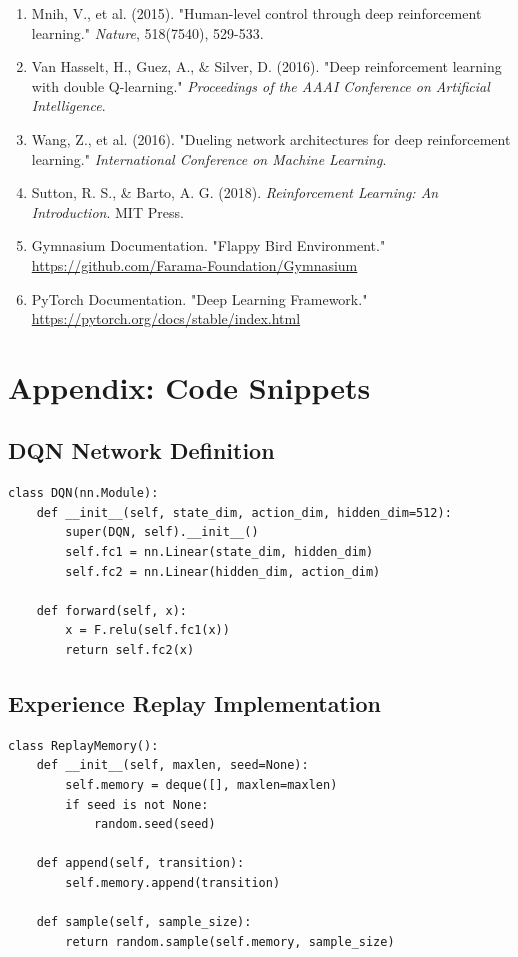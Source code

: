 \documentclass[12pt,a4paper]{article}
\begin{document}
\begin{enumerate}
    \item Mnih, V., et al. (2015). "Human-level control through deep reinforcement learning." \textit{Nature}, 518(7540), 529-533.
    
    \item Van Hasselt, H., Guez, A., \& Silver, D. (2016). "Deep reinforcement learning with double Q-learning." \textit{Proceedings of the AAAI Conference on Artificial Intelligence}.
    
    \item Wang, Z., et al. (2016). "Dueling network architectures for deep reinforcement learning." \textit{International Conference on Machine Learning}.
    
    \item Sutton, R. S., \& Barto, A. G. (2018). \textit{Reinforcement Learning: An Introduction}. MIT Press.
    
    \item Gymnasium Documentation. "Flappy Bird Environment." \\
    \url{https://github.com/Farama-Foundation/Gymnasium}
    
    \item PyTorch Documentation. "Deep Learning Framework." \\
    \url{https://pytorch.org/docs/stable/index.html}
\end{enumerate}

\appendix
\section{Appendix: Code Snippets}

\subsection{DQN Network Definition}
\begin{lstlisting}
class DQN(nn.Module):
    def __init__(self, state_dim, action_dim, hidden_dim=512):
        super(DQN, self).__init__()
        self.fc1 = nn.Linear(state_dim, hidden_dim)
        self.fc2 = nn.Linear(hidden_dim, action_dim)
    
    def forward(self, x):
        x = F.relu(self.fc1(x))
        return self.fc2(x)
\end{lstlisting}

\subsection{Experience Replay Implementation}
\begin{lstlisting}
class ReplayMemory():
    def __init__(self, maxlen, seed=None):
        self.memory = deque([], maxlen=maxlen)
        if seed is not None:
            random.seed(seed)
    
    def append(self, transition):
        self.memory.append(transition)
    
    def sample(self, sample_size):
        return random.sample(self.memory, sample_size)
\end{lstlisting}
\end{document}
